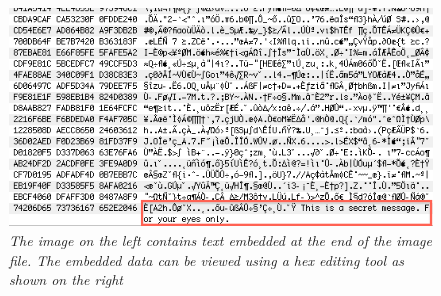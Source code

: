 \begin{itemize}
\begin{figure}[h!]
\includegraphics[scale=0.5]{embedded2}
\caption{\emph{The image on the left contains text embedded at the end of the image file. The embedded data can be viewed using a hex editing tool as shown on the right}}
\label{fig:embedded}
\end{figure} 

\end{itemize}
